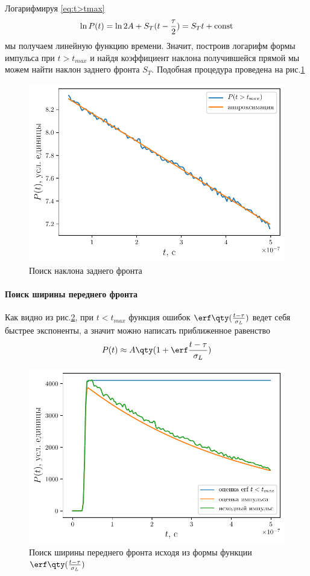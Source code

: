 Логарифмируя \eqref{eq:t>tmax}
\begin{equation}
    \ln P(t) = \ln 2A + S_T( t - \frac{\tau}{2}) = S_T t + \text{\rmfamily\upshape const} 
\end{equation}
мы получаем линейную функцию времени. Значит, построив логарифм формы импульса при
$t>t_{max}$ и найдя коэффициент наклона получившейся прямой мы можем найти
наклон заднего фронта $S_T$. Подобная процедура проведена на рис.\ref{fig:S_T}
 \begin{figure}[h]
    \centering
    \includegraphics[width=0.75\linewidth]{fig/imp08_7_1.pdf}
    \caption{Поиск наклона заднего фронта}
    \label{fig:S_T}
\end{figure}

\paragraph{Поиск ширины переднего фронта}%
Как видно из рис.\ref{fig:erf}, при $t<t_{max}$ функция ошибок
$\erf\qty(\frac{t - \tau}{\sigma_L})$ ведет себя
быстрее экспоненты, а значит можно написать приближенное равенство
\begin{equation}
    \label{eq:erf}
    P(t) \approx A \qty(1 + \erf\frac{t - \tau}{\sigma_L})
\end{equation}

\begin{figure}[h]
    \centering
    \includegraphics[width=0.75\linewidth]{fig/imp08_7_2.pdf}
    \caption{Поиск ширины переднего фронта исходя из формы функции
    $\erf\qty(\frac{t-\tau}{\sigma_L})$}
    \label{fig:erf}
\end{figure}

